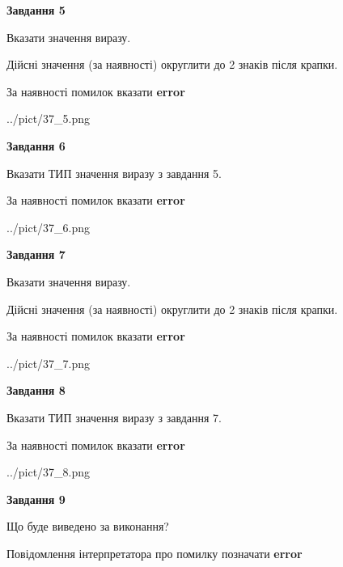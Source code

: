\documentclass[11pt, ukrainian]{article}
\begin{document}
{\begin {large}
{\begin {center}\textbf{Завдання 5}\end {center}}\par
Вказати значення виразу. \par
Дійсні значення (за наявності) округлити до 2 знаків після крапки. \par
За наявності помилок вказати \textbf{error}

\begin{center}
	{../pict/37_5.png}
\end{center}
\newpage

{\begin {center}\textbf{Завдання 6}\end {center}}\par
Вказати ТИП значення виразу з завдання 5. \par
За наявності помилок вказати \textbf{error}

\begin{center}
	{../pict/37_6.png}
\end{center}
\newpage

{\begin {center}\textbf{Завдання 7}\end {center}}\par
Вказати значення виразу. \par
Дійсні значення (за наявності) округлити до 2 знаків після крапки. \par
За наявності помилок вказати \textbf{error}

\begin{center}
	{../pict/37_7.png}
\end{center}
\newpage

{\begin {center}\textbf{Завдання 8}\end {center}}\par
Вказати ТИП значення виразу з завдання 7. \par
За наявності помилок вказати \textbf{error}

\begin{center}
	{../pict/37_8.png}
\end{center}
\newpage

{\begin {center}\textbf{Завдання 9}\end {center}}\par
Що буде виведено за виконання? \par
Повідомлення інтерпретатора про помилку позначати \textbf{error}


\end{large}}
\end{document}
